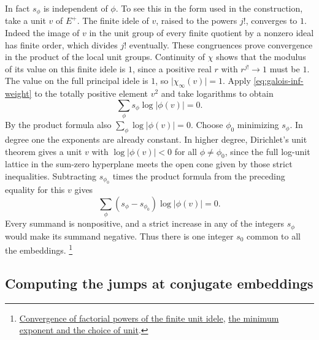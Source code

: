 In fact \(s_\phi\) is independent of \(\phi\). To see this in the form
used in the construction, take a unit \(v\) of \(E^+\). The finite
idele of \(v\), raised to the powers \(j!\), converges to \(1\).
Indeed the image of \(v\) in the unit group of every finite quotient
by a nonzero ideal has finite order, which divides \(j!\) eventually.
These congruences prove convergence in the product of the local unit
groups. Continuity of \(\chi\) shows that the modulus of its value
on this finite idele is \(1\), since a positive real \(r\) with
\(r^{j!}\to1\) must be \(1\). The value on the full principal idele
is \(1\), so \(\lvert\chi_\infty(v)\rvert=1\). Apply
\eqref{eq:galois-inf-weight} to the totally positive element \(v^2\)
and take logarithms to obtain
\[
               \sum_\phi s_\phi\log|\phi(v)|=0.
\]
By the product formula also \(\sum_\phi\log|\phi(v)|=0\). Choose
\(\phi_0\) minimizing \(s_\phi\). In degree one the exponents are
already constant. In higher degree, Dirichlet's unit theorem gives a
unit \(v\) with \(\log|\phi(v)|<0\) for all \(\phi\ne\phi_0\), since
the full log-unit lattice in the sum-zero hyperplane meets the open
cone given by those strict inequalities. Subtracting \(s_{\phi_0}\) times the
product formula from the preceding equality for this \(v\) gives
\[
         \sum_\phi (s_\phi-s_{\phi_0})\log|\phi(v)|=0 .
\]
Every summand is nonpositive, and a strict increase in any of the
integers \(s_\phi\) would make its summand negative. Thus there is
one integer \(s_0\) common to all the embeddings.
\footnote{\href{https://github.com/Deicyde/riemann-hypothesis/blob/40e56bab/src/Development/AutomorphicArithmetic/AutomorphicVarieties/BuildingsResidueChars/HeckeCharParallelWeight.lean\#L39-L87}{Convergence of factorial powers of the finite unit idele},
\href{https://github.com/Deicyde/riemann-hypothesis/blob/40e56bab/src/Development/AutomorphicArithmetic/AutomorphicVarieties/BuildingsResidueChars/HeckeCharParallelWeight.lean\#L178-L287}{the minimum exponent and the choice of unit}.}

\subsection{Computing the jumps at conjugate embeddings}

